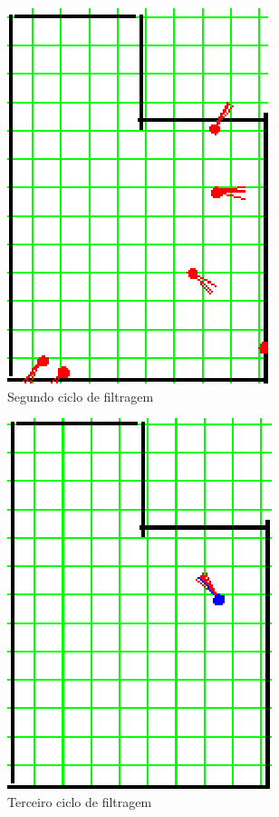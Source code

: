 \begin{figure}[H]
  \centering
  \includegraphics[scale=0.6]{figuras/cen1_ex5/3.eps}
  \caption[Segundo Ciclo de Filtragem]{Segundo ciclo de filtragem}
  \label{img:cen1_ex5_3}
\end{figure}

\begin{figure}[H]
  \centering
  \includegraphics[scale=0.6]{figuras/cen1_ex5/4.eps}
  \caption[Terceiro Ciclo de Filtragem]{Terceiro ciclo de filtragem}
  \label{img:cen1_ex5_4}
\end{figure}

